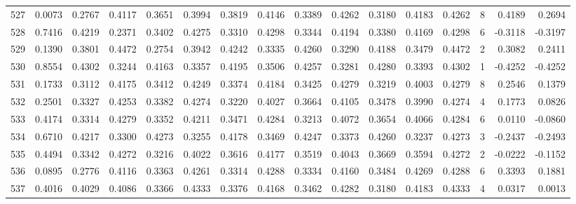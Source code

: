 \begin{tabular}{lrrrrrrrrrrrrrrr}
527 &      0.0073 &  0.2767 &  0.4117 &  0.3651 &  0.3994 &  0.3819 &  0.4146 &  0.3389 &  0.4262 &  0.3180 &   0.4183 &     0.4262 &      8 &                    0.4189 &                     0.2694 \\
528 &      0.7416 &  0.4219 &  0.2371 &  0.3402 &  0.4275 &  0.3310 &  0.4298 &  0.3344 &  0.4194 &  0.3380 &   0.4169 &     0.4298 &      6 &                   -0.3118 &                    -0.3197 \\
529 &      0.1390 &  0.3801 &  0.4472 &  0.2754 &  0.3942 &  0.4242 &  0.3335 &  0.4260 &  0.3290 &  0.4188 &   0.3479 &     0.4472 &      2 &                    0.3082 &                     0.2411 \\
530 &      0.8554 &  0.4302 &  0.3244 &  0.4163 &  0.3357 &  0.4195 &  0.3506 &  0.4257 &  0.3281 &  0.4280 &   0.3393 &     0.4302 &      1 &                   -0.4252 &                    -0.4252 \\
531 &      0.1733 &  0.3112 &  0.4175 &  0.3412 &  0.4249 &  0.3374 &  0.4184 &  0.3425 &  0.4279 &  0.3219 &   0.4003 &     0.4279 &      8 &                    0.2546 &                     0.1379 \\
532 &      0.2501 &  0.3327 &  0.4253 &  0.3382 &  0.4274 &  0.3220 &  0.4027 &  0.3664 &  0.4105 &  0.3478 &   0.3990 &     0.4274 &      4 &                    0.1773 &                     0.0826 \\
533 &      0.4174 &  0.3314 &  0.4279 &  0.3352 &  0.4211 &  0.3471 &  0.4284 &  0.3213 &  0.4072 &  0.3654 &   0.4066 &     0.4284 &      6 &                    0.0110 &                    -0.0860 \\
534 &      0.6710 &  0.4217 &  0.3300 &  0.4273 &  0.3255 &  0.4178 &  0.3469 &  0.4247 &  0.3373 &  0.4260 &   0.3237 &     0.4273 &      3 &                   -0.2437 &                    -0.2493 \\
535 &      0.4494 &  0.3342 &  0.4272 &  0.3216 &  0.4022 &  0.3616 &  0.4177 &  0.3519 &  0.4043 &  0.3669 &   0.3594 &     0.4272 &      2 &                   -0.0222 &                    -0.1152 \\
536 &      0.0895 &  0.2776 &  0.4116 &  0.3363 &  0.4261 &  0.3314 &  0.4288 &  0.3334 &  0.4160 &  0.3484 &   0.4269 &     0.4288 &      6 &                    0.3393 &                     0.1881 \\
537 &      0.4016 &  0.4029 &  0.4086 &  0.3366 &  0.4333 &  0.3376 &  0.4168 &  0.3462 &  0.4282 &  0.3180 &   0.4183 &     0.4333 &      4 &                    0.0317 &                     0.0013 \\

\end{tabular}
